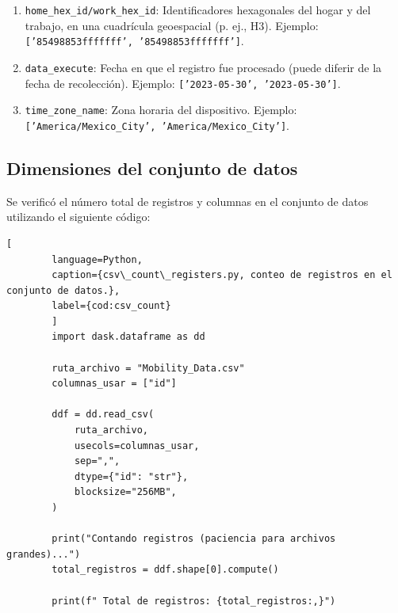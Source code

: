 \begin{enumerate}[leftmargin=*, align=left, noitemsep]

    \item \texttt{home\_hex\_id/work\_hex\_id}: Identificadores hexagonales del hogar y del trabajo, en una cuadrícula geoespacial (p. ej., H3).  
    Ejemplo: \texttt{['85498853fffffff', '85498853fffffff']}.

    \item \texttt{data\_execute}: Fecha en que el registro fue procesado (puede diferir de la fecha de recolección).  
    Ejemplo: \texttt{['2023-05-30', '2023-05-30']}.

    \item \texttt{time\_zone\_name}: Zona horaria del dispositivo.  
    Ejemplo: \texttt{['America/Mexico\_City', 'America/Mexico\_City']}.
\end{enumerate}


\newpage
\subsection{Dimensiones del conjunto de datos}
\label{subsec:dimensiones}
\noindent Se verificó el número total de registros y columnas en el conjunto de datos utilizando el siguiente código:

    \begin{lstlisting}[
        language=Python,
        caption={csv\_count\_registers.py, conteo de registros en el conjunto de datos.},
        label={cod:csv_count}
        ]
        import dask.dataframe as dd

        ruta_archivo = "Mobility_Data.csv" 
        columnas_usar = ["id"]  

        ddf = dd.read_csv(
            ruta_archivo,
            usecols=columnas_usar, 
            sep=",",             
            dtype={"id": "str"},  
            blocksize="256MB",   
        )

        print("Contando registros (paciencia para archivos grandes)...")
        total_registros = ddf.shape[0].compute() 

        print(f" Total de registros: {total_registros:,}")
    \end{lstlisting}

